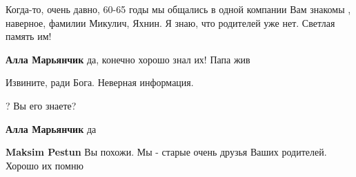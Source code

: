 \begin{itemize}
\begin{itemize}
Когда-то, очень давно, 60-65 годы мы общались в одной компании Вам знакомы ,
наверное, фамилии Микулич, Яхнин. Я знаю, что родителей уже нет. Светлая память
им!

\begin{itemize}
 
\textbf{Алла Марьянчик} да, конечно хорошо знал их! Папа жив


 
Извините, ради Бога. Неверная информация.
\end{itemize}

 
? Вы его знаете?


 
\textbf{Алла Марьянчик} да

\begin{itemize}
 
\textbf{Maksim Pestun} Вы похожи. Мы - старые очень друзья Ваших родителей. Хорошо их помню


 

\end{itemize}
\end{itemize}
\end{itemize}
